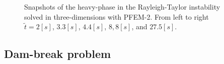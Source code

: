 \documentclass[a4paper,conference]{IEEEtran}
\begin{document}
\begin{figure}
\begin{center}
{    }
  \end{center}
  \caption{\label{fg:rayleigh-3d} Snapshots of the heavy-phase in the Rayleigh-Taylor instability solved in three-dimensions with PFEM-2. %
  From left to right $\widetilde{t} =2[s]$, $3.3[s]$, $4.4[s]$, $8,8[s]$, and $27.5[s]$.}
\end{figure}

\subsection{Dam-break problem}%
\end{document}
